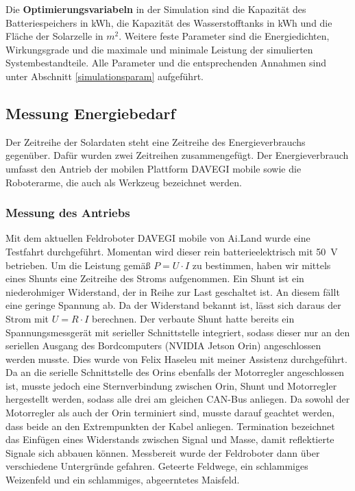 Die \textbf{Optimierungsvariabeln} in der Simulation sind die Kapazität des Batteriespeichers in kWh, die Kapazität des Wasserstofftanks in kWh und die Fläche der Solarzelle in $m^{2}$. Weitere feste Parameter sind die Energiedichten, Wirkungsgrade und die maximale und minimale Leistung der simulierten Systembestandteile. Alle Parameter und die entsprechenden Annahmen sind unter Abschnitt \ref{simulationsparam} aufgeführt.
\subsection{Messung Energiebedarf}
Der Zeitreihe der Solardaten steht eine Zeitreihe des Energieverbrauchs gegenüber. Dafür wurden zwei Zeitreihen zusammengefügt. Der Energieverbrauch umfasst den Antrieb der mobilen Plattform DAVEGI mobile sowie die Roboterarme, die auch als Werkzeug bezeichnet werden.
\subsubsection{Messung des Antriebs}
Mit dem aktuellen Feldroboter DAVEGI mobile von Ai.Land wurde eine Testfahrt durchgeführt. Momentan wird dieser rein batterieelektrisch mit 50~V betrieben. Um die Leistung gemäß $P = U \cdot I$ zu bestimmen, haben wir mittels eines Shunts eine Zeitreihe des Stroms aufgenommen. Ein Shunt ist ein niederohmiger Widerstand, der in Reihe zur Last geschaltet ist. An diesem fällt eine geringe Spannung ab. Da der Widerstand bekannt ist, lässt sich daraus der Strom mit $U = R \cdot I$ berechnen.
Der verbaute Shunt hatte bereits ein Spannungsmessgerät mit serieller Schnittstelle integriert, sodass dieser nur an den seriellen Ausgang des Bordcomputers (NVIDIA Jetson Orin) angeschlossen werden musste. Dies wurde von Felix Haseleu mit meiner Assistenz durchgeführt. Da an die serielle Schnittstelle des Orins ebenfalls der Motorregler angeschlossen ist, musste jedoch eine Sternverbindung zwischen Orin, Shunt und Motorregler hergestellt werden, sodass alle drei am gleichen CAN-Bus anliegen. Da sowohl der Motorregler als auch der Orin terminiert sind, musste darauf geachtet werden, dass beide an den Extrempunkten der Kabel anliegen. Termination bezeichnet das Einfügen eines Widerstands zwischen Signal und Masse, damit reflektierte Signale sich abbauen können. Messbereit wurde der Feldroboter dann über verschiedene Untergründe gefahren. Geteerte Feldwege, ein schlammiges Weizenfeld und ein schlammiges, abgeerntetes Maisfeld.
